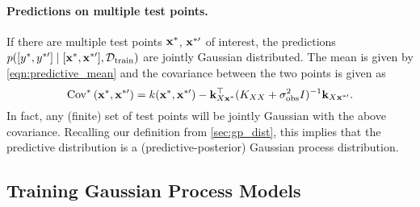 \paragraph{Predictions on multiple test points.}
If there are multiple test points $\mathbf{x}^*$, $\mathbf{x}^{*\prime}$ of interest, the predictions $p([y^*, y^{*\prime}] \mid [\mathbf{x}^*, \mathbf{x}^{*\prime}], \mathcal D_\text{train})$ are jointly Gaussian distributed.
The mean is given by \cref{eqn:predictive_mean} and the covariance between the two points is given as
\[ \text{Cov}^* \left( \mathbf{x}^*, \mathbf{x}^{*\prime} \right) = k(\mathbf{x}^*, \mathbf{x}^{*\prime}) - \mathbf{k}_{X\mathbf{x}^*}^\top ( K_{XX} + \sigma_\text{obs}^2 I )^{-1} \mathbf{k}_{X\mathbf{x}^{*\prime}}. \]
In fact, any (finite) set of test points will be jointly Gaussian with the above covariance.
Recalling our definition from \cref{sec:gp_dist}, this implies that the predictive distribution is a (predictive-posterior) Gaussian process distribution.

\subsection{Training Gaussian Process Models}
\label{sec:gp_training}

